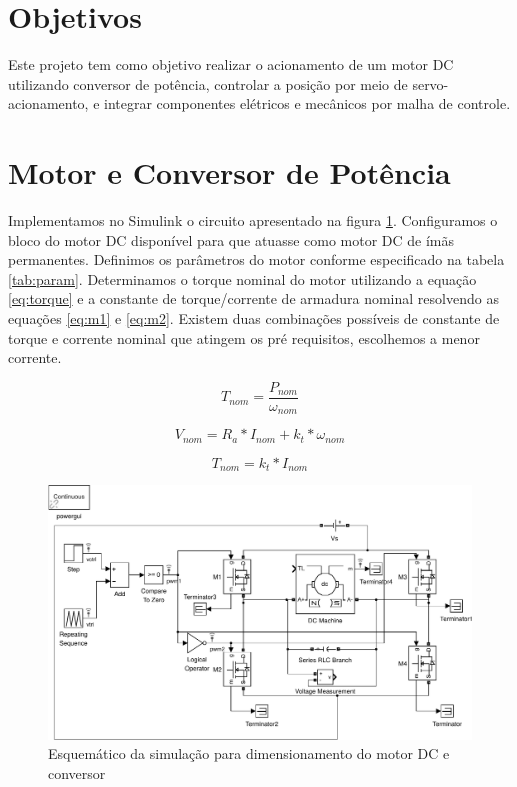 \documentclass{article}
\begin{document}


\onehalfspacing
\section{Objetivos}
	Este projeto tem como objetivo realizar o acionamento de um motor DC utilizando conversor de potência, controlar a posição por meio de servo-acionamento, e integrar componentes elétricos e mecânicos por malha de controle. 

\section{Motor e Conversor de Potência}
Implementamos no Simulink o circuito apresentado na figura \ref{fig:sim1}. Configuramos o bloco do motor DC disponível para que atuasse como motor DC de ímãs permanentes. Definimos os parâmetros do motor conforme especificado na tabela \ref{tab:param}. Determinamos o torque nominal do motor utilizando a equação \ref{eq:torque} e a constante de torque/corrente de armadura nominal resolvendo as equações \ref{eq:m1} e \ref{eq:m2}. Existem duas combinações possíveis de constante de torque e corrente nominal que atingem os pré requisitos, escolhemos a menor corrente.

\begin{equation}
	\label{eq:torque}
	T_{nom} = \frac{P_{nom}}{\omega_{nom}}
\end{equation}

\begin{equation}
\label{eq:m1}
	V_{nom} = R_a*I_{nom} + k_t*\omega_{nom}
\end{equation}

\begin{equation}
	\label{eq:m2}
	T_{nom} = k_t*I_{nom}
\end{equation}


\begin{figure}[H]
	\centering
	\includegraphics[width=\linewidth]{matlab/sim1}
	\caption{Esquemático da simulação para dimensionamento do motor DC e conversor}
	\label{fig:sim1}
\end{figure}
\end{document}
